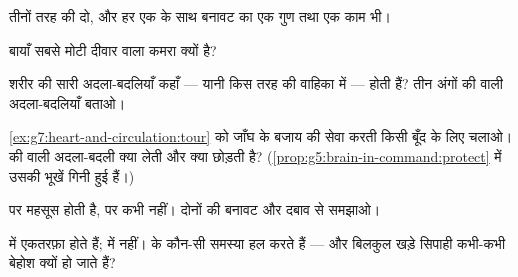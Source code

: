 \begin{exercise}[$\star$]\label{exo:g7:heart-and-circulation:4}
तीनों तरह की  दो, और हर एक के साथ बनावट का एक गुण तथा एक काम
भी।
\end{exercise}

\begin{exercise}[$\star$]\label{exo:g7:heart-and-circulation:5}
बायाँ  सबसे मोटी दीवार वाला कमरा क्यों है?
\end{exercise}

\begin{exercise}[$\star$]\label{exo:g7:heart-and-circulation:6}
शरीर की सारी अदला-बदलियाँ कहाँ --- यानी किस तरह की वाहिका में --- होती
हैं? तीन अंगों की  वाली अदला-बदलियाँ बताओ।
\end{exercise}

\begin{exercise}[$\star\star$]\label{exo:g7:heart-and-circulation:7}
\cref{ex:g7:heart-and-circulation:tour} को जाँघ के बजाय  की
सेवा करती किसी बूँद के लिए चलाओ।  की  वाली अदला-बदली
क्या लेती और क्या छोड़ती है?
(\cref{prop:g5:brain-in-command:protect} में उसकी भूखें गिनी हुई
हैं।)
\end{exercise}

\begin{exercise}[$\star\star$]\label{exo:g7:heart-and-circulation:8}
  पर महसूस होती है,  पर कभी नहीं। दोनों  की
बनावट और दबाव से समझाओ।
\end{exercise}

\begin{exercise}[$\star\star$]\label{exo:g7:heart-and-circulation:9}
 में एकतरफ़ा  होते हैं;  में नहीं।  के 
कौन-सी समस्या हल करते हैं --- और बिलकुल  खड़े सिपाही कभी-कभी बेहोश
क्यों हो जाते हैं?
\end{exercise}

